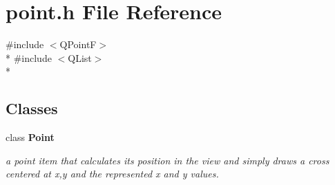 \section{point.\+h File Reference}
\label{curve_2point_8h}
{\ttfamily \#include $<$Q\+PointF$>$}\\*
{\ttfamily \#include $<$Q\+List$>$}\\*
\subsection*{Classes}
\begin{DoxyCompactItemize}
\item 
class {\bf Point}
\begin{DoxyCompactList}\small\item\em a point item that calculates its position in the view and simply draws a cross centered at x,y and the represented x and y values. \end{DoxyCompactList}\end{DoxyCompactItemize}
